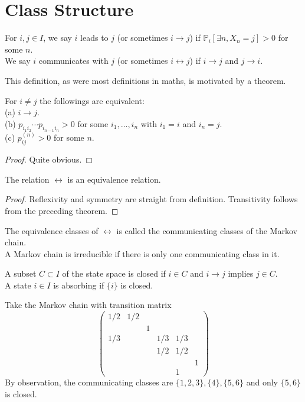 \section{Class Structure}
\begin{definition}
    For $i,j\in I$, we say $i$ leads to $j$ (or sometimes $i\rightarrow j$) if $\mathbb P_i[\exists n,X_n=j]>0$ for some $n$.\\
    We say $i$ communicates with $j$ (or sometimes $i\leftrightarrow j$) if $i\rightarrow j$ and $j\rightarrow i$.
\end{definition}
This definition, as were most definitions in maths, is motivated by a theorem.
\begin{theorem}
    For $i\neq j$ the followings are equivalent:\\
    (a) $i\rightarrow j$.\\
    (b) $p_{i_1i_2}\cdots p_{i_{n-1}i_n}>0$ for some $i_1,\ldots,i_n$ with $i_1=i$ and $i_n=j$.\\
    (c) $p_{ij}^{(n)}>0$ for some $n$.
\end{theorem}
\begin{proof}
    Quite obvious.
\end{proof}
\begin{proposition}
    The relation $\leftrightarrow$ is an equivalence relation.
\end{proposition}
\begin{proof}
    Reflexivity and symmetry are straight from definition.
    Transitivity follows from the preceding theorem.
\end{proof}
\begin{definition}
    The equivalence classes of $\leftrightarrow$ is called the communicating classes of the Markov chain.\\
    A Markov chain is irreducible if there is only one communicating class in it.
\end{definition}
\begin{definition}
    A subset $C\subset I$ of the state space is closed if $i\in C$ and $i\rightarrow j$ implies $j\in C$.\\
    A state $i\in I$ is absorbing if $\{i\}$ is closed.
\end{definition}
\begin{example}
    Take the Markov chain with transition matrix
    $$\begin{pmatrix}
        1/2&1/2&&&\\
        &&1&&&\\
        1/3&&&1/3&1/3&\\
        &&&1/2&1/2&\\
        &&&&&1\\
        &&&&1&
    \end{pmatrix}$$
    By observation, the communicating classes are $\{1,2,3\},\{4\},\{5,6\}$ and only $\{5,6\}$ is closed.
\end{example}